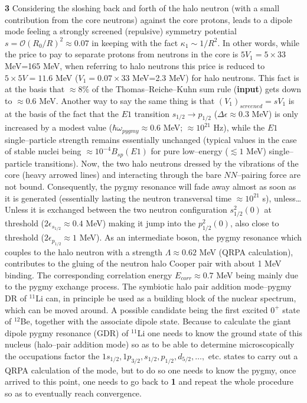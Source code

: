 \textbf{3} Considering the sloshing back and forth of the halo neutron (with a small contribution from the core neutrons) against the core protons, leads to a dipole mode feeling a strongly screened (repulsive) symmetry potential $s=\mathscr O(R_0/R)^2\approx 0.07$ in keeping with the fact $\kappa_1\sim 1/R^2$. In other words, while the price to pay to separate protons from neutrons in the core is $5V_1=5\times 33$ MeV=165 MeV, when referring to halo neutrons this price is reduced to $5\times 5 V=11.6$ MeV ($V_1=0.07\times33$ MeV=2.3 MeV) for halo neutrons. This fact is at the basis that $\approx 8\%$ of the Thomas--Reiche--Kuhn sum rule (\textbf{input}) gets down to $\approx 0.6$ MeV. Another way to say the same thing is that $(V_1)_{screened}=sV_1$ is at the basis of the fact that the $E1$ transition $s_{1/2}\rightarrow p_{1/2}$ ($\Delta \epsilon\approx 0.3$ MeV) is only increased by a modest value ($\hbar \omega_{pygmy}\approx 0.6$ MeV; $\approx 10^{21}$ Hz), while the $E1$  single--particle strength remains essentially unchanged (typical values in the case of stable nuclei being $\approx 10^{-4} B_{sp} (E1)$ for pure low--energy ($\lesssim 1$ MeV) single--particle transitions). Now, the two halo neutrons dressed by the vibrations of the core (heavy arrowed lines) and interacting through the bare $NN$--pairing force are not bound. Consequently, the pygmy resonance will fade away almost as soon as it is generated (essentially lasting the neutron transversal time $\approx 10^{21}$ s), unless\dots Unless it is exchanged between the two neutron configuration $s^{2}_{1/2}(0)$ at threshold ($2\epsilon_{s_{1/2}}\approx 0.4$ MeV) making it jump into the $p^2_{1/2}(0)$, also close to threshold     ($2\epsilon_{p_{1/2}}\approx 1$ MeV). As an intermediate boson, the pygmy resonance which couples to the halo neutron with a strength $\Lambda\approx0.62$ MeV (QRPA calculation), contributes to the gluing of the neutron halo Cooper pair with about 1 MeV binding. The corresponding correlation energy $E_{corr}\approx0.7$ MeV being mainly due to the pygmy exchange process. The symbiotic halo pair addition mode--pygmy DR of $^{11}$Li can, in principle be used as a building block of the nuclear spectrum, which can be moved around. A possible candidate being the first excited $0^+$ state of $^{12}$Be, together with the associate dipole state. Because to calculate the giant dipole pygmy resonance (GDR) of $^{11}$Li one needs to know the ground state of this nucleus (halo--pair addition mode) so as to be able to determine microscopically the occupations factor the $1s_{1/2},1p_{3/2},s_{1/2},p_{1/2},d_{5/2},\dots,$ etc. states to carry out a QRPA calculation of the mode, but to do so one needs to know the pygmy, once arrived to this point, one needs to go back to \textbf{1} and repeat the whole procedure so as to eventually reach convergence. 

